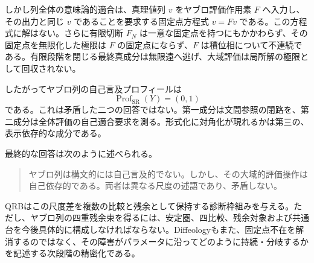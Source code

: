\documentclass[a4paper,11pt]{ltjsarticle}
\theoremstyle{definition}
\theoremstyle{plain}
\newcommand{\SR}{\operatorname{SR}}
\newcommand{\Prof}{\operatorname{Prof}}
\begin{document}
しかし列全体の意味論的適合は、真理値列 $v$ をヤブロ評価作用素 $F$ へ入力し、その出力と同じ $v$ であることを要求する固定点方程式 $v=Fv$ である。この方程式に解はない。さらに有限切断 $F_N$ は一意な固定点を持つにもかかわらず、その固定点を無限化した極限は $F$ の固定点にならず、$F$ は積位相について不連続である。有限段階を閉じる最終真成分は無限遠へ逃げ、大域評価は局所解の極限として回収されない。

したがってヤブロ列の自己言及プロフィールは
\begin{equation*}
 \Prof_{\SR}(Y)=(0,1)
\end{equation*}
である。これは矛盾した二つの回答ではない。第一成分は文間参照の閉路を、第二成分は全体評価の自己適合要求を測る。形式化に対角化が現れるかは第三の、表示依存的な成分である。

最終的な回答は次のように述べられる。
\begin{quote}
ヤブロ列は構文的には自己言及的でない。しかし、その大域的評価操作は自己依存的である。両者は異なる尺度の述語であり、矛盾しない。
\end{quote}

QRBはこの尺度差を複数の比較と残余として保持する診断枠組みを与える。ただし、ヤブロ列の四重残余束を得るには、安定圏、四比較、残余対象および共通台を今後具体的に構成しなければならない。Diffeologyもまた、固定点不在を解消するのではなく、その障害がパラメータに沿ってどのように持続・分岐するかを記述する次段階の精密化である。



\end{document}
